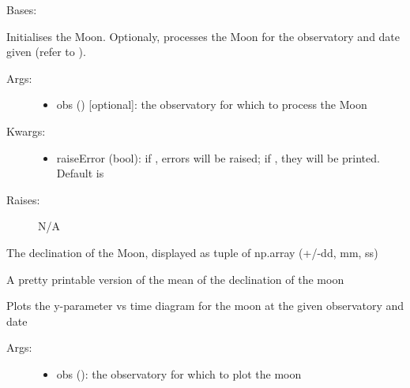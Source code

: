 \documentclass[letterpaper,10pt,english]{sphinxmanual}
\begin{document}
\begin{fulllineitems}
\label{astroobs:astroobs.Moon}
Bases: 

Initialises the Moon. Optionaly, processes the Moon for the observatory and date given (refer to ).
\begin{description}
\item[{Args:}] \leavevmode\begin{itemize}
\item {} 
obs () {[}optional{]}: the observatory for which to process the Moon

\end{itemize}

\item[{Kwargs:}] \leavevmode\begin{itemize}
\item {} 
raiseError (bool): if , errors will be raised; if , they will be printed. Default is 

\end{itemize}

\item[{Raises:}] \leavevmode
N/A

\end{description}

\begin{fulllineitems}
\label{astroobs:astroobs.Moon.dec}
The declination of the Moon, displayed as tuple of np.array (+/-dd, mm, ss)

\end{fulllineitems}


\begin{fulllineitems}
\label{astroobs:astroobs.Moon.decStr}
A pretty printable version of the mean of the declination of the moon

\end{fulllineitems}


\begin{fulllineitems}
\label{astroobs:astroobs.Moon.plot}
Plots the y-parameter vs time diagram for the moon at the given observatory and date
\begin{description}
\item[{Args:}] \leavevmode\begin{itemize}
\item {} 
obs (): the observatory for which to plot the moon


\end{itemize}
\end{description}
\end{fulllineitems}
\end{fulllineitems}
\end{document}
